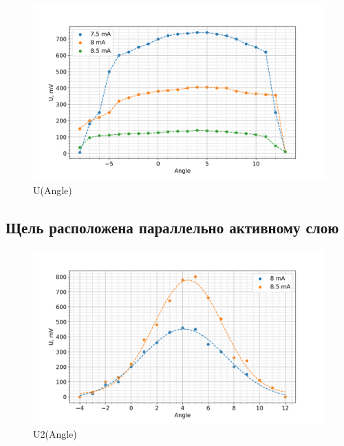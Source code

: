 \documentclass[a4paper]{article}
\begin{document}
\begin{figure}[H]
    \begin{center}
        \includegraphics[scale=0.5]{g1.png}
        \caption{U(Angle)}
        \label{g1}
    \end{center}
\end{figure}


\subsection{Щель расположена параллельно активному слою}

\begin{figure}[H]
    \begin{center}
        \includegraphics[scale=0.5]{g2.png}
        \caption{U2(Angle)}
        \label{g2}
    \end{center}
\end{figure}



\end{document}
